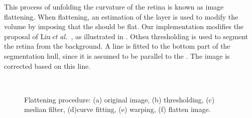 This process of unfolding the curvature of the retina is known as image flattening. When flattening, an estimation of the \rpe  layer is used to modify the volume by imposing that the \rpe  should be flat.
Our implementation modifies the proposal of Liu\,\textit{et al.}~\cite{Liu2011}, as illustrated in . Othsu thresholding is used to segment the retina from the background. A line is fitted to the bottom part of the segmentation hull, since it is assumed to be parallel to the \rpe. The image is corrected based on this line.

\begin{figure}[t]
\centering 
  \hspace*{\fill}
  \hfill
  \hfill
  \hspace*{\fill}	
  \\
  \hspace*{\fill}
  \hfill
  \hfill
  \hspace*{\fill}
  \caption{Flattening procedure: (a) original image, (b) thresholding, (c) median filter, (d)curve fitting, (e) warping, (f) flatten image.}
  \label{fig:flatten}
\end{figure}


